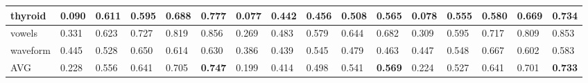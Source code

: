 \begin{table}[]
{\begin{tabular}{|l|lllll|llllllllll|}
thyroid     & \multicolumn{1}{l|}{0.090} & \multicolumn{1}{l|}{0.611} & \multicolumn{1}{l|}{0.595} & \multicolumn{1}{l|}{0.688} & 0.777          & \multicolumn{1}{l|}{0.077} & \multicolumn{1}{l|}{0.442} & \multicolumn{1}{l|}{0.456} & \multicolumn{1}{l|}{0.508} & \multicolumn{1}{l|}{0.565}          & \multicolumn{1}{l|}{0.078} & \multicolumn{1}{l|}{0.555} & \multicolumn{1}{l|}{0.580} & \multicolumn{1}{l|}{0.669} & 0.734          \\ \hline
vowels      & \multicolumn{1}{l|}{0.331} & \multicolumn{1}{l|}{0.623} & \multicolumn{1}{l|}{0.727} & \multicolumn{1}{l|}{0.819} & 0.856          & \multicolumn{1}{l|}{0.269} & \multicolumn{1}{l|}{0.483} & \multicolumn{1}{l|}{0.579} & \multicolumn{1}{l|}{0.644} & \multicolumn{1}{l|}{0.682}          & \multicolumn{1}{l|}{0.309} & \multicolumn{1}{l|}{0.595} & \multicolumn{1}{l|}{0.717} & \multicolumn{1}{l|}{0.809} & 0.853          \\ \hline
waveform    & \multicolumn{1}{l|}{0.445} & \multicolumn{1}{l|}{0.528} & \multicolumn{1}{l|}{0.650} & \multicolumn{1}{l|}{0.614} & 0.630          & \multicolumn{1}{l|}{0.386} & \multicolumn{1}{l|}{0.439} & \multicolumn{1}{l|}{0.545} & \multicolumn{1}{l|}{0.479} & \multicolumn{1}{l|}{0.463}          & \multicolumn{1}{l|}{0.447} & \multicolumn{1}{l|}{0.548} & \multicolumn{1}{l|}{0.667} & \multicolumn{1}{l|}{0.602} & 0.583          \\ \hline
AVG         & \multicolumn{1}{l|}{0.228} & \multicolumn{1}{l|}{0.556} & \multicolumn{1}{l|}{0.641} & \multicolumn{1}{l|}{0.705} & \textbf{0.747} & \multicolumn{1}{l|}{0.199} & \multicolumn{1}{l|}{0.414} & \multicolumn{1}{l|}{0.498} & \multicolumn{1}{l|}{0.541} & \multicolumn{1}{l|}{\textbf{0.569}} & \multicolumn{1}{l|}{0.224} & \multicolumn{1}{l|}{0.527} & \multicolumn{1}{l|}{0.641} & \multicolumn{1}{l|}{0.701} & \textbf{0.733} \\ \hline
\end{tabular}%
}
\end{table}


